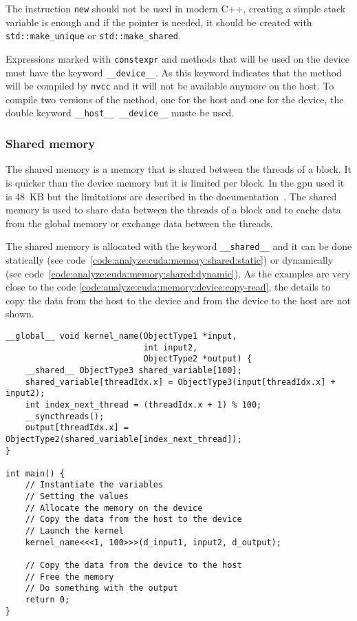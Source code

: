 The instruction \texttt{new} should not be used in modern C++, creating a simple
stack variable is enough and if the pointer is needed, it should be created with
\texttt{std::make\_unique} or \texttt{std::make\_shared}.

Expressions marked with \texttt{constexpr} and methods that will be used on the device must have the
keyword \texttt{\_\_device\_\_}.
As this keyword indicates that the method will be compiled by \texttt{nvcc} and
it will not be available anymore on the host.
To compile two versions of the method, one for the host and one for the device,
the double keyword \texttt{\_\_host\_\_ \_\_device\_\_} muste be used.


\subsubsection{Shared memory}
\label{ch:analyze:cuda:memory:shared}

The shared memory is a memory that is shared between the threads of a block.
It is quicker than the device memory but it is limited per block.
In the \acrshort{gpu} used it is 48~KB but the limitations are described in the
documentation~\cite{cuda-capability}.
The shared memory is used to share data between the threads of a block and to
cache data from the global memory or exchange data between the threads.

The shared memory is allocated with the keyword \texttt{\_\_shared\_\_} and it
can be done statically (see code~\ref{code:analyze:cuda:memory:shared:static}) or
dynamically (see code~\ref{code:analyze:cuda:memory:shared:dynamic}).
As the examples are very close to the code \ref{code:analyze:cuda:memory:device:copy-read},
the details to copy the data from the host to the device and from the device to
the host are not shown.

\begin{code}
    \label{code:analyze:cuda:memory:shared:static}
    \begin{verbatim}
__global__ void kernel_name(ObjectType1 *input,
                            int input2,
                            ObjectType2 *output) {
    __shared__ ObjectType3 shared_variable[100];
    shared_variable[threadIdx.x] = ObjectType3(input[threadIdx.x] + input2);
    int index_next_thread = (threadIdx.x + 1) % 100;
    __syncthreads();
    output[threadIdx.x] = ObjectType2(shared_variable[index_next_thread]);
}

int main() {
    // Instantiate the variables
    // Setting the values
    // Allocate the memory on the device
    // Copy the data from the host to the device
    // Launch the kernel
    kernel_name<<<1, 100>>>(d_input1, input2, d_output);

    // Copy the data from the device to the host
    // Free the memory
    // Do something with the output
    return 0;
}
    \end{verbatim}
\end{code}

